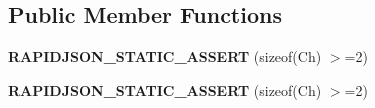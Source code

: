 \subsection*{Public Member Functions}
\begin{DoxyCompactItemize}
\item 
{\bfseries R\+A\+P\+I\+D\+J\+S\+O\+N\+\_\+\+S\+T\+A\+T\+I\+C\+\_\+\+A\+S\+S\+E\+RT} (sizeof(Ch) $>$=2)\hypertarget{struct_u_t_f16_a04aeeefa5dcba7c5156bc78a5c1f1557}{}\label{struct_u_t_f16_a04aeeefa5dcba7c5156bc78a5c1f1557}

\item 
{\bfseries R\+A\+P\+I\+D\+J\+S\+O\+N\+\_\+\+S\+T\+A\+T\+I\+C\+\_\+\+A\+S\+S\+E\+RT} (sizeof(Ch) $>$=2)\hypertarget{struct_u_t_f16_a04aeeefa5dcba7c5156bc78a5c1f1557}{}\label{struct_u_t_f16_a04aeeefa5dcba7c5156bc78a5c1f1557}

\end{DoxyCompactItemize}
